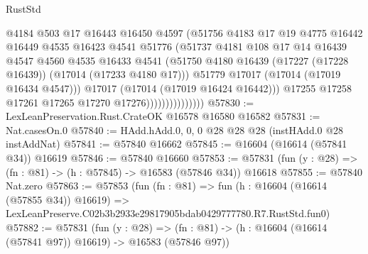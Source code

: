 \begin{lexlean}{RustStd}
\begin{coremodule}
                                  @4184
                                  @503
                                  @17
                                  @16443
                                  @16450
                                  @4597
                                  (@51756
                                    @4183
                                    @17
                                    @19
                                    @4775
                                    @16442
                                    @16449
                                    @4535
                                    @16423
                                    @4541
                                    @51776
                                    (@51737
                                      @4181
                                      @108
                                      @17
                                      @14
                                      @16439
                                      @4547
                                      @4560
                                      @4535
                                      @16433
                                      @4541
                                      (@51750
                                        @4180
                                        @16439
                                        (@17227 (@17228 @16439))
                                        (@17014 (@17233 @4180 @17)))
                                      @51779
                                      @17017
                                      (@17014 (@17019 @16434 @4547)))
                                    @17017
                                    (@17014 (@17019 @16424 @16442)))
                                  @17255
                                  @17258
                                  @17261
                                  @17265
                                  @17270
                                  @17276)))))))))))))))
@57830 := LexLeanPreservation.Rust.CrateOK @16578 @16580 @16582
@57831 := Nat.casesOn.{0}
@57840 := HAdd.hAdd.{0, 0, 0} @28 @28 @28 (instHAdd.{0} @28 instAddNat)
@57841 := @57840 @16662
@57845 := @16604 (@16614 (@57841 @34)) @16619
@57846 := @57840 @16660
@57853 := @57831 (fun (y : @28) => (fn : @81) -> (h : @57845) -> @16583 (@57846 @34)) @16618
@57855 := @57840 Nat.zero
@57863 := @57853
    (fun (fn : @81) =>
    fun (h : @16604 (@16614 (@57855 @34)) @16619) =>
    LexLeanPreserve.C02b3b2933e29817905bdab0429777780.R7.RustStd.fun0)
@57882 := @57831
    (fun (y : @28) =>
    (fn : @81) -> (h : @16604 (@16614 (@57841 @97)) @16619) -> @16583 (@57846 @97))

\end{coremodule}
\end{lexlean}
